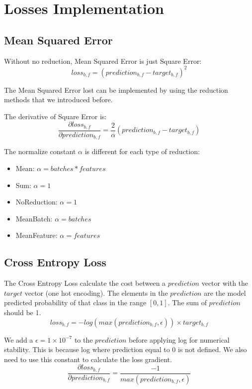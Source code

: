 \documentclass[conference]{IEEEtran}
\begin{document}
\section{Losses Implementation}
\subsection{Mean Squared Error}
Without no reduction, Mean Squared Error is just Square Error:
\begin{equation}
loss_{b,f} = (prediction_{b,f} - target_{b,f})^2
\end{equation}

The Mean Squared Error lost can be implemented by using the reduction methods that we introduced before.

The derivative of Square Error is:
\begin{equation}
\frac{\partial loss_{b,f}}{\partial prediction_{b,f}}  =  \frac{2}{\alpha}(prediction_{b,f} - target_{b,f})
\end{equation}

The normalize constant \(\alpha\) is different for each type of reduction:
\begin{itemize}
    \item Mean: \(\alpha = batches*features\)
    \item Sum: \(\alpha = 1\)
    \item NoReduction: \(\alpha = 1\)
    \item MeanBatch: \(\alpha = batches\)
    \item MeanFeature: \(\alpha = features\)
\end{itemize}


\subsection{Cross Entropy Loss}
The Cross Entropy Loss calculate the cost between a \(prediction\) vector with the \(target\) vector (one hot encoding). The elements in the \(prediction\) are the model predicted probability of that class in the range \([0,1]\). The sum of \(prediction\) should be 1.
\begin{equation}
loss_{b,f} = -log(max(prediction_{b,f}, \epsilon)) \times target_{b,f}
\end{equation}

We add a \(\epsilon = 1 \times 10^{-7}\) to the \(prediction\) before applying log for numerical stability. This is because log where prediction equal to 0 is not defined. We also need to use this constant to calculate the loss gradient.
\begin{equation}
\frac{\partial loss_{b,f}}{\partial prediction_{b,f}} = \frac{-1}{max(prediction_{b,f}, \epsilon)}
\end{equation}
\end{document}
